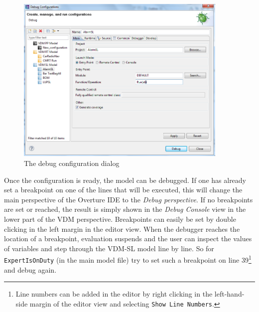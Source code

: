 \begin{figure}[htp]
\begin{center}
  \includegraphics[width=4in]{figures/debuglauncer}
  \caption{The debug configuration dialog}
  \label{fig:debugConfiguration}
\end{center}
\end{figure}
%
Once the configuration is ready, the model can be debugged. If one has already set a breakpoint on one of the lines that will be executed, this will change the main perspective of the Overture IDE to the \emph{Debug perspective}. If no breakpoints are set or reached, the result is simply shown in the \emph{Debug Console} view in the lower part of the VDM perspective. Breakpoints can easily be set by double clicking in the left margin in the editor view. When the debugger reaches the location of a breakpoint, evaluation suspends and the user can inspect the values of variables and step through the VDM-SL model line by line. So for \texttt{ExpertIsOnDuty} (in the main model file) try to set such a breakpoint on line 39\footnote{Line numbers can be added in the editor by right clicking in the left-hand-side margin of the editor view and selecting \texttt{Show Line Numbers}.}
and debug again.
%
